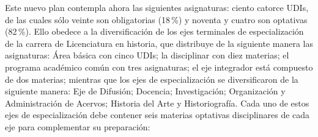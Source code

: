 Este nuevo plan contempla ahora las siguientes asignaturas: 
ciento catorce UDIs, de las cuales sólo veinte son obligatorias (18\,\%) y 
noventa y cuatro son optativas (82\,\%). Ello obedece a 
la diversificación de los ejes terminales de especialización de la 
carrera de Licenciatura en historia, que distribuye de la siguiente 
manera las asignaturas: Área básica con cinco UDIs; la disciplinar con diez materias; 
el programa académico común con tres asignaturas; el eje integrador 
está compuesto de dos materias; mientras que los ejes de especialización se 
diversificaron de la siguiente manera: Eje de Difusión; Docencia; 
Investigación; Organización y Administración de Acervos; Historia del 
Arte y Historiografía. Cada uno de estos ejes de especialización debe 
contener seis materias optativas disciplinares de cada eje para 
complementar su preparación:
\newpage

